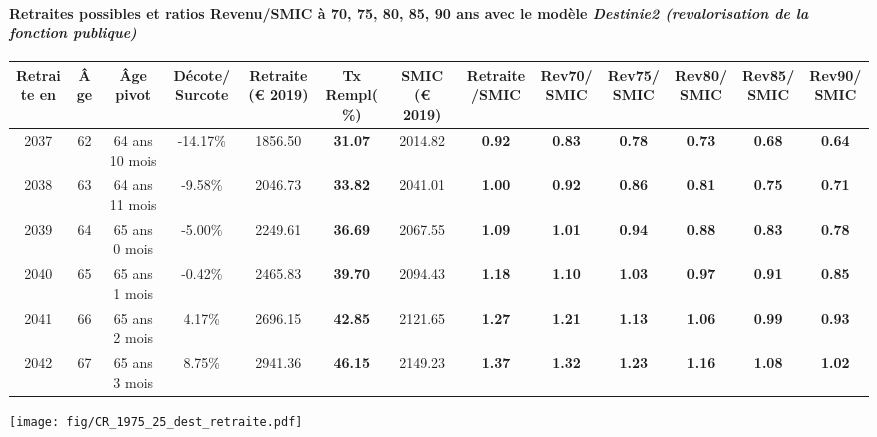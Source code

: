 \paragraph{Retraites possibles et ratios Revenu/SMIC à 70, 75, 80, 85, 90 ans avec le modèle \emph{Destinie2 (revalorisation de la fonction publique)}}  
 
{ \scriptsize \begin{center} 
\begin{tabular}[htb]{|c|c||c|c||c|c||c||c|c|c|c|c|c|} 
\hline 
 Retraite en &  Âge &  Âge pivot &  Décote/Surcote &  Retraite (\euro{} 2019) &  Tx Rempl(\%) &  SMIC (\euro{} 2019) &  Retraite/SMIC &  Rev70/SMIC &  Rev75/SMIC &  Rev80/SMIC &  Rev85/SMIC &  Rev90/SMIC \\ 
\hline \hline 
 2037 &  62 &  64 ans 10 mois &  -14.17\% &  1856.50 &  {\bf 31.07} &  2014.82 &  {\bf {\color{red} 0.92}} &  {\bf {\color{red} 0.83}} &  {\bf {\color{red} 0.78}} &  {\bf {\color{red} 0.73}} &  {\bf {\color{red} 0.68}} &  {\bf {\color{red} 0.64}} \\ 
\hline 
 2038 &  63 &  64 ans 11 mois &  -9.58\% &  2046.73 &  {\bf 33.82} &  2041.01 &  {\bf 1.00} &  {\bf {\color{red} 0.92}} &  {\bf {\color{red} 0.86}} &  {\bf {\color{red} 0.81}} &  {\bf {\color{red} 0.75}} &  {\bf {\color{red} 0.71}} \\ 
\hline 
 2039 &  64 &  65 ans 0 mois &  -5.00\% &  2249.61 &  {\bf 36.69} &  2067.55 &  {\bf 1.09} &  {\bf 1.01} &  {\bf {\color{red} 0.94}} &  {\bf {\color{red} 0.88}} &  {\bf {\color{red} 0.83}} &  {\bf {\color{red} 0.78}} \\ 
\hline 
 2040 &  65 &  65 ans 1 mois &  -0.42\% &  2465.83 &  {\bf 39.70} &  2094.43 &  {\bf 1.18} &  {\bf 1.10} &  {\bf 1.03} &  {\bf {\color{red} 0.97}} &  {\bf {\color{red} 0.91}} &  {\bf {\color{red} 0.85}} \\ 
\hline 
 2041 &  66 &  65 ans 2 mois &  4.17\% &  2696.15 &  {\bf 42.85} &  2121.65 &  {\bf 1.27} &  {\bf 1.21} &  {\bf 1.13} &  {\bf 1.06} &  {\bf {\color{red} 0.99}} &  {\bf {\color{red} 0.93}} \\ 
\hline 
 2042 &  67 &  65 ans 3 mois &  8.75\% &  2941.36 &  {\bf 46.15} &  2149.23 &  {\bf 1.37} &  {\bf 1.32} &  {\bf 1.23} &  {\bf 1.16} &  {\bf 1.08} &  {\bf 1.02} \\ 
\hline 
\hline 
\end{tabular} 
\end{center} } 

 \begin{center}\texttt{[image: fig/CR\_1975\_25\_dest\_retraite.pdf]}\end{center} \label{fig/CR_1975_25_dest_retraite.pdf} 

